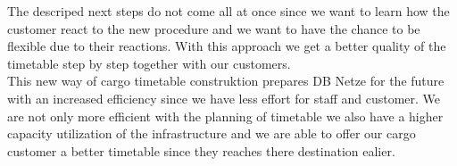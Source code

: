 The descriped next steps do not come all at once since we want to learn how the customer react to the new procedure and we want to have the chance to be flexible due to their reactions. With this approach we get a better quality of the timetable step by step together with our customers. \\
This new way of cargo timetable construktion prepares DB Netze for the future with an increased efficiency since we have less effort for staff and customer. We are not only more efficient with the planning of timetable we also have a higher capacity utilization of the infrastructure and we are able to offer our cargo customer a better timetable since they reaches there destination ealier.   \\

